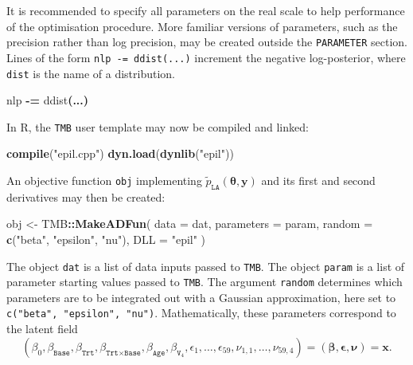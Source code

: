 \documentclass[a4paper, nobind]{templates/ociamthesis}
\newenvironment{Shaded}{\begin{snugshade}}{\end{snugshade}}
\newcommand{\AttributeTok}[1]{\textcolor[rgb]{0.13,0.29,0.53}{#1}}
\newcommand{\FunctionTok}[1]{\textcolor[rgb]{0.13,0.29,0.53}{\textbf{#1}}}
\newcommand{\NormalTok}[1]{#1}
\newcommand{\OperatorTok}[1]{\textcolor[rgb]{0.81,0.36,0.00}{\textbf{#1}}}
\newcommand{\OtherTok}[1]{\textcolor[rgb]{0.56,0.35,0.01}{#1}}
\newcommand{\SpecialCharTok}[1]{\textcolor[rgb]{0.81,0.36,0.00}{\textbf{#1}}}
\newcommand{\StringTok}[1]{\textcolor[rgb]{0.31,0.60,0.02}{#1}}
\renewenvironment{Shaded}
{
  \vspace{10pt}%
  \begin{snugshade}%
}{%
  \end{snugshade}%
  \vspace{8pt}%
}
\begin{document}
It is recommended to specify all parameters on the real scale to help performance of the optimisation procedure.
More familiar versions of parameters, such as the precision rather than log precision, may be created outside the \texttt{PARAMETER} section.
Lines of the form \texttt{nlp\ -=\ ddist(...)} increment the negative log-posterior, where \texttt{dist} is the name of a distribution.

\begin{Shaded}
\begin{Highlighting}[]
\NormalTok{nlp }\OperatorTok{{-}=}\NormalTok{ ddist}\OperatorTok{(...)}
\end{Highlighting}
\end{Shaded}

In R, the \texttt{TMB} user template may now be compiled and linked:

\begin{Shaded}
\begin{Highlighting}[]
\FunctionTok{compile}\NormalTok{(}\StringTok{"epil.cpp"}\NormalTok{)}
\FunctionTok{dyn.load}\NormalTok{(}\FunctionTok{dynlib}\NormalTok{(}\StringTok{"epil"}\NormalTok{))}
\end{Highlighting}
\end{Shaded}

An objective function \texttt{obj} implementing \(\tilde p_{\texttt{LA}}(\boldsymbol{\mathbf{\theta}}, \mathbf{y})\) and its first and second derivatives may then be created:

\begin{Shaded}
\begin{Highlighting}[]
\NormalTok{obj }\OtherTok{\textless{}{-}}\NormalTok{ TMB}\SpecialCharTok{::}\FunctionTok{MakeADFun}\NormalTok{(}
  \AttributeTok{data =}\NormalTok{ dat,}
  \AttributeTok{parameters =}\NormalTok{ param,}
  \AttributeTok{random =} \FunctionTok{c}\NormalTok{(}\StringTok{"beta"}\NormalTok{, }\StringTok{"epsilon"}\NormalTok{, }\StringTok{"nu"}\NormalTok{),}
  \AttributeTok{DLL =} \StringTok{"epil"}
\NormalTok{)}
\end{Highlighting}
\end{Shaded}

The object \texttt{dat} is a list of data inputs passed to \texttt{TMB}.
The object \texttt{param} is a list of parameter starting values passed to \texttt{TMB}.
The argument \texttt{random} determines which parameters are to be integrated out with a Gaussian approximation, here set to \texttt{c("beta",\ "epsilon",\ "nu")}.
Mathematically, these parameters correspond to the latent field
\begin{equation}
(\beta_0, \beta_\texttt{Base}, \beta_\texttt{Trt}, \beta_{\texttt{Trt} \times \texttt{Base}}, \beta_\texttt{Age}, \beta_{\texttt{V}_4}, \epsilon_1, \ldots, \epsilon_{59}, \nu_{1,1}, \ldots, \nu_{59,4}) = (\boldsymbol{\mathbf{\beta}}, \boldsymbol{\mathbf{\epsilon}}, \boldsymbol{\mathbf{\nu}}) = \mathbf{x}.
\end{equation}
\end{document}
